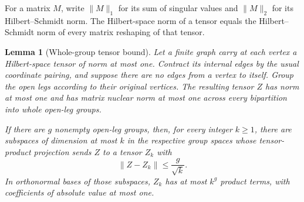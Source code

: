 \documentclass[11pt]{article}
\numberwithin{equation}{section}
\newtheorem{lemma}[theorem]{Lemma}
\theoremstyle{definition}
\theoremstyle{remark}
\newcommand{\norm}[1]{\lVert #1\rVert}
\begin{document}
For a matrix $M$, write $\norm{M}_1$ for its
sum of singular values and $\norm{M}_2$ for its Hilbert--Schmidt norm.  The
Hilbert-space norm of a tensor equals the Hilbert--Schmidt norm of every
matrix reshaping of that tensor.

\begin{lemma}[Whole-group tensor bound]\label{lem:group-tensor}
Let a finite graph carry at each vertex a Hilbert-space tensor of norm at
most one.  Contract its internal edges by the usual coordinate pairing,
and suppose there are no edges from a vertex to itself.  Group the open
legs according to their original vertices.  The resulting tensor $Z$ has
norm at most one and has matrix nuclear norm at most one across every
bipartition into whole open-leg groups.

If there are $g$ nonempty open-leg groups, then, for every integer $k\ge1$,
there are subspaces of dimension at most $k$ in the respective group spaces
whose tensor-product projection sends $Z$ to a tensor $Z_k$ with
\begin{equation}\label{eq:group-truncation}
 \norm{Z-Z_k}\le\frac{g}{\sqrt{k}}.
\end{equation}
In orthonormal bases of those subspaces, $Z_k$ has at most $k^g$ product
terms, with coefficients of absolute value at most one.
\end{lemma}
\end{document}
